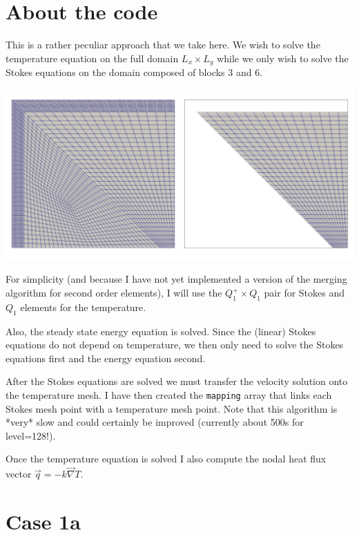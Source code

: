 \section*{About the code}

This is a rather peculiar approach that we take here. We wish to solve the 
temperature equation on the full domain $L_x \times L_y$ while 
we only wish to solve the Stokes equations on the domain composed of 
blocks 3 and 6. 

\begin{center}
\includegraphics[width=14cm]{python_codes/fieldstone_149/results/meshing/meshes}
\end{center}


For simplicity (and because I have not yet implemented a version of the 
merging algorithm for second order elements), I will use 
the $Q_1^+\times Q_1$ pair for Stokes and $Q_1$ elements for the temperature.

Also, the steady state energy equation is solved. Since the (linear) Stokes equations 
do not depend on temperature, we then only need to solve the Stokes equations 
first and the energy equation second.

After the Stokes equations are solved we must transfer the velocity solution 
onto the temperature mesh. I have then created the {\tt mapping} array
that links each Stokes mesh point with a temperature mesh point.
Note that this algorithm is *very* slow and could certainly be improved
(currently about 500s for level=128!). 

Once the temperature equation is solved I also compute the nodal heat flux vector
$\vec{q}=-k \vec\nabla T$.

\newpage
\section*{Case 1a}

